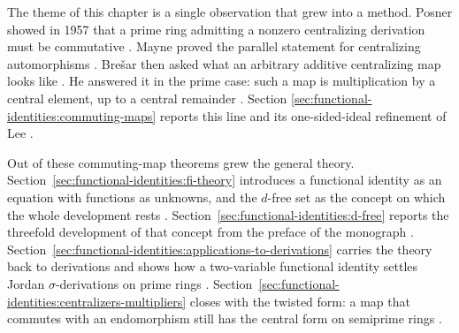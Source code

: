The theme of this chapter is a single observation that grew into a method.
Posner showed in 1957 that a prime ring admitting a nonzero centralizing
derivation must be commutative
\cite[p.~385]{Bresar1993}. Mayne proved the parallel statement
for centralizing automorphisms \cite[p.~385]{Bresar1993}.
Bre\v{s}ar then asked what an arbitrary additive centralizing map looks
like \cite[p.~385]{Bresar1993}. He answered it in the prime
case: such a map is multiplication by a central element, up to a central
remainder \cite[Theorem~A, p.~385]{Bresar1993}. Section
\ref{sec:functional-identities:commuting-maps} reports this line and its
one-sided-ideal refinement of Lee
\cite[Theorem~2, p.~334]{LeeTK1997Centralizing}.

Out of these commuting-map theorems grew the general theory.
Section~\ref{sec:functional-identities:fi-theory} introduces a functional
identity as an equation with functions as unknowns, and the $d$-free set
as the concept on which the whole development rests
\cite[p.~9 and p.~x]{BresarMartindaleChebotar2007FI}.
Section~\ref{sec:functional-identities:d-free} reports the threefold
development of that concept from the preface of the monograph
\cite[p.~x]{BresarMartindaleChebotar2007FI}.
Section~\ref{sec:functional-identities:applications-to-derivations}
carries the theory back to derivations and shows how a two-variable
functional identity settles Jordan $\sigma$-derivations on prime rings
\cite[Theorem~2.1, p.~2]{LeeTK2015JordanFI}.
Section~\ref{sec:functional-identities:centralizers-multipliers} closes
with the twisted form: a map that commutes with an endomorphism still has
the central form on semiprime rings
\cite[Theorem~2, p.~2948]{LeeTK2001SigmaCommuting}.

